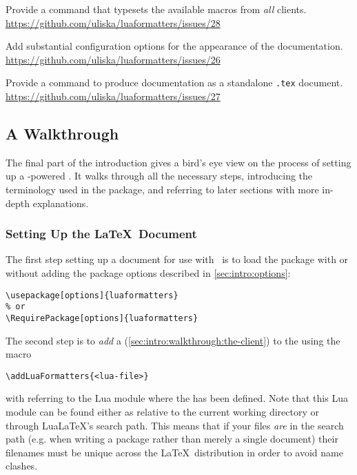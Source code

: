 \documentclass[12pt]{scrartcl}
\begin{document}
\begin{itemize*}
	\item Provide a command that typesets the available macros from \emph{all} clients.\\
	\url{https://github.com/uliska/luaformatters/issues/28}
	\item Add substantial configuration options for the appearance of the documentation.\\
	\url{https://github.com/uliska/luaformatters/issues/26}
	\item Provide a command to produce documentation as a standalone \texttt{.tex} document.\\
	\url{https://github.com/uliska/luaformatters/issues/27}
\end{itemize*}


\subsection{A Walkthrough}
\label{sec:intro:walkthrough}

The final part of the introduction gives a bird's eye view on the process of
setting up a \luaformatters-powered .  It walks through
all the necessary steps, introducing the terminology used in the package, and
referring to later sections with more in-depth explanations.

\subsubsection{Setting Up the \LaTeX\ Document}
\label{sec:intro:walkthrough:latex-document}

The first step setting up a document for use with \luaformatters\ is to load the
package with or without adding the package options described in
\vref{sec:intro:options}:

\begin{verbatim}
\usepackage[options]{luaformatters}
% or
\RequirePackage[options]{luaformatters}
\end{verbatim}

\noindent The second step is to \emph{add} a 
(\vref{sec:intro:walkthrough:the-client}) to the  using
the macro

\begin{verbatim}
\addLuaFormatters{<lua-file>}
\end{verbatim}

\noindent with  referring to the Lua module where the
 has been defined.  Note that this Lua module can be found either
as relative to the current working directory or through Lua\LaTeX's search path.
This means that if your files \emph{are} in the search path (e.g. when writing
a package rather than merely a single document) their filenames must be unique
across the \LaTeX\ distribution in order to avoid name clashes.
\end{document}
